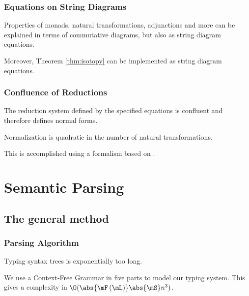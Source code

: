\documentclass[math, english, info]{beamercours}
\begin{document}
\begin{frame}
	\frametitle{Equations on String Diagrams}
	Properties of monads, natural transformations, adjunctions
	and more can be explained in terms of commutative diagrams, but also as
	string diagram equations.

	Moreover, Theorem \ref{thm:isotopy} can be implemented as string diagram
	equations.
\end{frame}

\begin{frame}
	\frametitle{Confluence of Reductions}
	\begin{thm}[Confluence]\label{thm:confluence}
		The reduction system defined by the specified equations is confluent and
		therefore defines normal forms.
	\end{thm}

	\smallskip

	\begin{thm}
		\label{thm:normalize}
		Normalization is quadratic in the number of natural transformations.
	\end{thm}
	This is accomplished using a formalism based on \cite{delpeuchNormalizationPlanarString2022}.
\end{frame}

\section{Semantic Parsing}
\subsection{The general method}
\begin{frame}
	\frametitle{Parsing Algorithm}
	Typing syntax trees is exponentially too long.

	\pause\medskip

	We use a Context-Free Grammar in five parts to model our typing system.
	This gives a complexity in $\O(\abs{\mF\left(\mL\right)}\abs{\mS}n^{3})$.
\end{frame}
\end{document}
